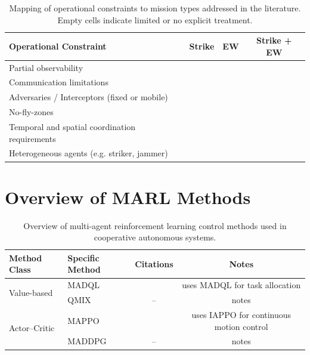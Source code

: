 \begin{table}[htbp]
\centering
\caption{Mapping of operational constraints to mission types addressed in the literature. Empty cells indicate limited or no explicit treatment.}
\label{tab:mission_constraints_empty}
\begin{tabular}{lccc}
\toprule
\textbf{Operational Constraint}
& \textbf{Strike}
& \textbf{EW}
& \textbf{Strike + EW} \\
\midrule
Partial observability 
& \cite{Wang2025CooperativeUAV}
& 
& \\

Communication limitations  
& \cite{Wang2025CooperativeUAV}
& 
& \\

Adversaries / Interceptors (fixed or mobile)
& \cite{Wang2025CooperativeUAV}
& 
& \cite{xu2025mdrl_uav_combat, yue2022uav_sead_hmarl} \\

No-fly-zones 
& \cite{yuksek2021cooperative}
& 
& \\

Temporal and spatial coordination requirements 
& \cite{yuksek2021cooperative}
& 
& \\

Heterogeneous agents (e.g. striker, jammer)
& \cite{Wang2025CooperativeUAV}
& 
& \cite{yue2022uav_sead_hmarl} \\


\bottomrule
\end{tabular}
\end{table}




\section{Overview of MARL Methods}

\begin{table}[htbp]
\centering
\caption{Overview of multi-agent reinforcement learning control methods used in cooperative autonomous systems.}
\label{tab:marl_methods}
\begin{tabular}{llcc}
\toprule
\textbf{Method Class} 
& \textbf{Specific Method} 
& \textbf{Citations} 
& \textbf{Notes} \\
\midrule

\multirow{2}{*}{Value-based}
& MADQL 
& \cite{yue2022uav_sead_hmarl} 
& \cite{yue2022uav_sead_hmarl} uses MADQL for task allocation \\

& QMIX 
& -- 
& notes \\

\midrule
\multirow{2}{*}{Actor--Critic}
& MAPPO 
& \cite{yue2022uav_sead_hmarl}
& \cite{yue2022uav_sead_hmarl} uses IAPPO for continuous motion control \\

& MADDPG 
& -- 
& notes \\

\bottomrule
\end{tabular}
\end{table}

